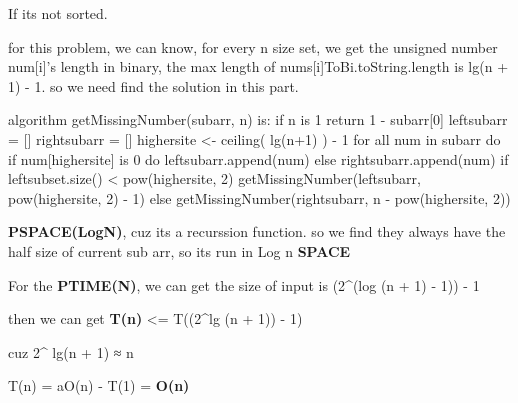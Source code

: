 \documentclass[
]{article}
\newenvironment{Shaded}{}{}
\newcommand{\NormalTok}[1]{#1}
\begin{document}
If its not sorted.

for this problem, we can know, for every n size set, we get the unsigned
number num{[}i{]}'s length in binary, the max length of
nums{[}i{]}ToBi.toString.length is lg(n + 1) - 1. so we need find the
solution in this part.

\begin{Shaded}
\begin{Highlighting}[]
\NormalTok{algorithm getMissingNumber(subarr, n) is:}
\NormalTok{	if n is 1}
\NormalTok{		return 1 {-} subarr[0]}
\NormalTok{		leftsubarr = []}
\NormalTok{		rightsubarr = []}
\NormalTok{		highersite \textless{}{-} ceiling( lg(n+1) ) {-} 1}
\NormalTok{		for all num in subarr do}
\NormalTok{			if num[highersite] is 0 do}
\NormalTok{				leftsubarr.append(num)}
\NormalTok{			else}
\NormalTok{				rightsubarr.append(num)}
\NormalTok{		if leftsubset.size() \textless{} pow(highersite, 2)}
\NormalTok{			getMissingNumber(leftsubarr, pow(highersite, 2) {-} 1)}
\NormalTok{		else}
\NormalTok{			getMissingNumber(rightsubarr, n {-} pow(highersite, 2))}
\end{Highlighting}
\end{Shaded}

\textbf{PSPACE(LogN)}, cuz its a recurssion function. so we find they
always have the half size of current sub arr, so its run in Log n
\textbf{SPACE}

For the \textbf{PTIME(N)}, we can get the size of input is (2\^{}(log (n
+ 1) - 1)) - 1

then we can get \textbf{T(n)} \textless= T((2\^{}lg (n + 1)) - 1)

cuz 2\^{} lg(n + 1) ≈ n

T(n) = aO(n) - T(1) = \textbf{O(n)}
\end{document}
